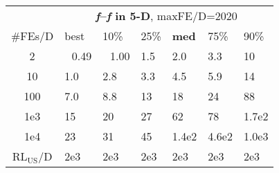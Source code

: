 \begin{tabular}{c|llllll}
 & \multicolumn{6}{|c}{\textbf{\textit{f}\raisebox{-0.35ex}{1}--\textit{f}\raisebox{-0.35ex}{24} in 5-D}, maxFE/D=2020}\\
\#FEs/D & best & 10\% & 25\% & \textbf{med} & 75\% & 90\%\\
2 & ~\,0.49 & ~\,1.00 & \hspace*{1ex}1.5 & \hspace*{1ex}2.0 & \hspace*{1ex}3.3 & 10\\
10 & \hspace*{1ex}1.0 & \hspace*{1ex}2.8 & \hspace*{1ex}3.3 & \hspace*{1ex}4.5 & \hspace*{1ex}5.9 & 14\\
100 & \hspace*{1ex}7.0 & \hspace*{1ex}8.8 & 13 & 18 & 24 & 88\\
1e3 & 15 & 20 & 27 & 62 & 78 & 1.7e2\\
1e4 & 23 & 31 & 45 & 1.4e2 & 4.6e2 & 1.0e3\\
$\text{RL}_{\text{US}}$/D & 2e3 & 2e3 & 2e3 & 2e3 & 2e3 & 2e3
\end{tabular}
